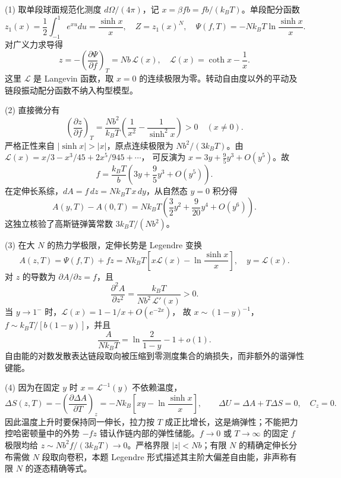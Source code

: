 (1) 取单段球面规范化测度 \(d\Omega/(4\pi)\)，记 \(x=\beta fb=fb/(k_BT)\)。单段配分函数
\[
z_1(x)=\frac12\int_{-1}^{1}e^{xu}du=\frac{\sinh x}{x},\quad
Z=z_1(x)^N,\quad
\Psi(f,T)=-Nk_BT\ln\frac{\sinh x}{x}.
\]
对广义力求导得
\[
z=-\left(\frac{\partial\Psi}{\partial f}\right)_T
=Nb\,\mathcal L(x),\quad \mathcal L(x)=\coth x-\frac1x.
\]
这里 \(\mathcal L\) 是 Langevin 函数，取 \(x=0\) 的连续极限为零。转动自由度以外的平动及链段振动配分函数不纳入构型模型。

(2) 直接微分有
\[
\left(\frac{\partial z}{\partial f}\right)_T
=\frac{Nb^2}{k_BT}\left(\frac1{x^2}-\frac1{\sinh^2x}\right)>0
\quad(x\ne0).
\]
严格正性来自 \(|\sinh x|>|x|\)，原点连续极限为 \(Nb^2/(3k_BT)\)。由
\(\mathcal L(x)=x/3-x^3/45+2x^5/945+\cdots\)，
可反演为 \(x=3y+\frac95y^3+O(y^5)\)。故
\[
f=\frac{k_BT}{b}\left(3y+\frac95y^3+O(y^5)\right).
\]
在定伸长系综，\(dA=f\,dz=Nk_BT\,x\,dy\)，从自然态 \(y=0\) 积分得
\[
A(y,T)-A(0,T)
=Nk_BT\left(\frac32y^2+\frac9{20}y^4+O(y^6)\right).
\]
这独立核验了高斯链弹簧常数 \(3k_BT/(Nb^2)\)。

(3) 在大 \(N\) 的热力学极限，定伸长势是 Legendre 变换
\[
A(z,T)=\Psi(f,T)+fz=Nk_BT
\left[x\mathcal L(x)-\ln\frac{\sinh x}{x}\right],
\quad y=\mathcal L(x).
\]
对 \(z\) 的导数为
\(\partial A/\partial z=f\)，且
\[
\frac{\partial^2A}{\partial z^2}
=\frac{k_BT}{Nb^2\,\mathcal L'(x)}>0.
\]
当 \(y\to1^-\) 时，\(\mathcal L(x)=1-1/x+O(e^{-2x})\)，
故 \(x\sim(1-y)^{-1}\)，\(f\sim k_BT/[b(1-y)]\)，并且
\[
\frac{A}{Nk_BT}
=\ln\frac2{1-y}-1+o(1).
\]
自由能的对数发散表达链段取向被压缩到零测度集合的熵损失，而非额外的谐弹性键能。

(4) 因为在固定 \(y\) 时 \(x=\mathcal L^{-1}(y)\) 不依赖温度，
\[
\Delta S(z,T)=-\left(\frac{\partial\Delta A}{\partial T}\right)_z
=-Nk_B\left[x y-\ln\frac{\sinh x}{x}\right],\qquad
\Delta U=\Delta A+T\Delta S=0,\quad C_z=0.
\]
因此温度上升时要保持同一伸长，拉力按 \(T\) 成正比增长，这是熵弹性；不能把力控哈密顿量中的外势 \(-fz\) 错认作链内部的弹性储能。\(f\to0\) 或 \(T\to\infty\) 的固定 \(f\) 极限均给 \(z\sim Nb^2 f/(3k_BT)\to0\)。严格界限 \(|z|<Nb\)；有限 \(N\) 的精确定伸长分布需做 \(N\) 段取向卷积，本题 Legendre 形式描述其主阶大偏差自由能，非声称有限 \(N\) 的逐态精确等式。
